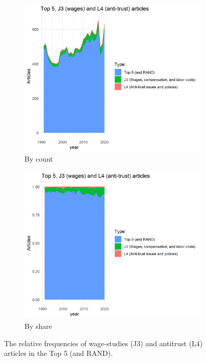 \documentclass[11pt, letterpaper, twoside]{article}
\begin{document}
\begin{figure}[!ht]
    \begin{subfigure}[h]{0.49\textwidth}
        \centering
        \includegraphics[width=\textwidth]{j3-l4-top5.png}
        \caption{By count}
    \end{subfigure}
    \hfill
    \begin{subfigure}[h]{0.49\textwidth}
        \centering
        \includegraphics[width=\textwidth]{j3-l4-top5-normalized.png}
        \caption{By share}
    \end{subfigure}
    \caption{The relative frequencies of wage-studies (J3) and antitrust (L4) articles in the Top 5 (and RAND).}
\end{figure}
\end{document}
